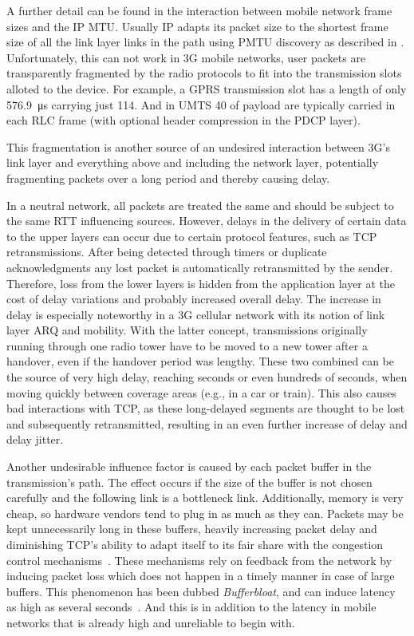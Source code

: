 A further detail can be found in the interaction between mobile network frame sizes and the \gls{IP} \gls{MTU}. Usually \gls{IP} adapts its packet size to the shortest frame size of all the link layer links in the path using \gls{PMTU} discovery as described in \cite{rfc1191}. Unfortunately, this can not work in \gls{3G} mobile networks, user packets are transparently fragmented by the radio protocols to fit into the transmission slots alloted to the device. For example, a \gls{GPRS} transmission slot has a length of only \SI{576.9}{\micro\second} carrying just \SI{114}{\bit}. And in \gls{UMTS} \SI{40}{\byte} of payload are typically carried in each \gls{RLC} frame (with optional header compression in the \gls{PDCP} layer).

This fragmentation is another source of an undesired interaction between \gls{3G}'s link layer and everything above and including the network layer, potentially fragmenting packets over a long period and thereby causing delay.

In a neutral network, all packets are treated the same and should be subject to the same \gls{RTT} influencing sources. However, delays in the delivery of certain data to the upper layers can occur due to certain protocol features, such as \gls{TCP} retransmissions. After being detected through timers or duplicate acknowledgments any lost packet is automatically retransmitted by the sender. Therefore, loss from the lower layers is hidden from the application layer at the cost of delay variations and probably increased overall delay. The increase in delay is especially noteworthy in a \gls{3G} cellular network with its notion of link layer \gls{ARQ} and mobility. With the latter concept, transmissions originally running through one radio tower have to be moved to a new tower after a handover, even if the handover period was lengthy. These two combined can be the source of very high delay, reaching seconds or even hundreds of seconds, when moving quickly between coverage areas (e.g., in a car or train). 
This also causes bad interactions with \gls{TCP}, as these long-delayed segments are thought to be lost and subsequently retransmitted, resulting in an even further increase of delay and delay jitter.

Another undesirable influence factor is caused by each packet buffer in the transmission's path. The effect occurs if the size of the buffer is not chosen carefully and the following link is a bottleneck link. Additionally, memory is very cheap, so hardware vendors tend to plug in as much as they can. Packets may be kept unnecessarily long in these buffers, heavily increasing packet delay and diminishing \gls{TCP}'s ability to adapt itself to its fair share with the congestion control mechanisms~\cite{jacobson1988congestion,scharf2011comparison}. These mechanisms rely on feedback from the network by inducing packet loss which does not happen in a timely manner in case of large buffers. This phenomenon has been dubbed \textit{Bufferbloat}, and can induce latency as high as several seconds~\cite{gettys2011bufferbloat,groenewegen2011detecting}. And this is in addition to the latency in mobile networks that is already high and unreliable to begin with.

